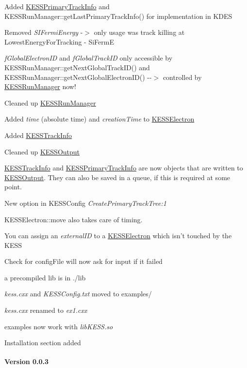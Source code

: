 \begin{DoxyItemize}
\item Added \hyperlink{class_kassiopeia_1_1_k_e_s_s_primary_track_info}{KESSPrimaryTrackInfo} and KESSRunManager::getLastPrimaryTrackInfo() for implementation in KDES
\item Removed {\itshape SIFermiEnergy\/} -\/$>$ only usage was track killing at LowestEnergyForTracking -\/ SiFermE
\item {\itshape fGlobalElectronID\/} and {\itshape fGlobalTrackID\/} only accessible by KESSRunManager::getNextGlobalTrackID() and KESSRunManager::getNextGlobalElectronID() -\/-\/$>$ controlled by \hyperlink{class_kassiopeia_1_1_k_e_s_s_run_manager}{KESSRunManager} now!
\item Cleaned up \hyperlink{class_kassiopeia_1_1_k_e_s_s_run_manager}{KESSRunManager}
\item Added {\itshape time\/} (absolute time) and {\itshape creationTime\/} to \hyperlink{class_kassiopeia_1_1_k_e_s_s_electron}{KESSElectron}
\item Added \hyperlink{class_kassiopeia_1_1_k_e_s_s_track_info}{KESSTrackInfo}
\item Cleaned up \hyperlink{class_kassiopeia_1_1_k_e_s_s_output}{KESSOutput}
\item \hyperlink{class_kassiopeia_1_1_k_e_s_s_track_info}{KESSTrackInfo} and \hyperlink{class_kassiopeia_1_1_k_e_s_s_primary_track_info}{KESSPrimaryTrackInfo} are now objects that are written to \hyperlink{class_kassiopeia_1_1_k_e_s_s_output}{KESSOutput}. They can also be saved in a queue, if this is required at some point.
\item New option in KESSConfig {\itshape CreatePrimaryTrackTree:1\/} 
\item KESSElectron::move also takes care of timing.
\item You can assign an {\itshape externalID\/} to a \hyperlink{class_kassiopeia_1_1_k_e_s_s_electron}{KESSElectron} which isn't touched by the KESS
\item Check for configFile will now ask for input if it failed
\item a precompiled lib is in ./lib
\item {\itshape kess.cxx\/} and {\itshape KESSConfig.txt\/} moved to examples/
\item {\itshape kess.cxx\/} renamed to {\itshape ex1.cxx\/} 
\item examples now work with {\itshape libKESS.so\/} 
\item Installation section added
\end{DoxyItemize}\hypertarget{_k_e_s_s_changelog_v003}{}\paragraph{Version 0.0.3}\label{_k_e_s_s_changelog_v003}

